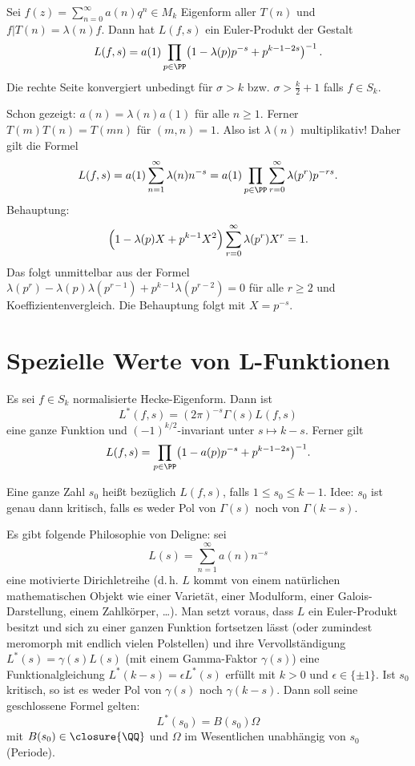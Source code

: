 \begin{satz}
	Sei $f(z) = \sum_{n=0}^\infty a(n)q^n \in M_k$ Eigenform aller $T(n)$ und $f|T(n) = \lambda(n)f$. Dann hat $L(f, s)$ ein Euler-Produkt der Gestalt 
	\[
		L(f,s) = a(1) \prod_{p \in \PP} \bigl(1 - \lambda(p)p^{-s} + p^{k-1-2s}\bigr)^{-1}\,.
	\]
	Die rechte Seite konvergiert unbedingt für $\sigma > k$ bzw. $\sigma > \frac{k}{2} + 1$ falls $f \in S_k$.
\end{satz}


\begin{bewe}
	Schon gezeigt: $a(n) = \lambda(n)a(1)$ für alle $n \geq 1$. Ferner $T(m)T(n) = T(mn)$ für $(m,n) = 1$. Also ist $\lambda(n)$ multiplikativ! Daher gilt die Formel 
	\[L(f,s) = a(1)\sum_{n=1}^\infty \lambda(n)n^{-s} = a(1) \prod_{p \in \PP} \sum_{r=0}^\infty \lambda(p^r)p^{-rs}.\]
	Behauptung: 
	\[
		\Bigl(1 - \lambda(p)X + p^{k-1}X^2\Bigr) \sum_{r=0}^\infty \lambda(p^r) X^r = 1.
	\]
	Das folgt unmittelbar aus der Formel $\lambda(p^r) - \lambda(p)\lambda(p^{r-1}) + p^{k-1}\lambda(p^{r-2}) = 0$ für alle $r \geq 2$ und Koeffizientenvergleich. Die Behauptung folgt mit $X = p^{-s}$.
\end{bewe}


\section{Spezielle Werte von L-Funktionen}

\begin{erin}
	Es sei $f \in S_k$ normalisierte Hecke-Eigenform. Dann ist
	\[
		L^*(f, s) = (2\pi)^{-s} \Gamma(s) L(f, s)
	\]
	eine ganze Funktion und $(-1)^{k/2}$-invariant unter $s \mapsto k - s$. Ferner gilt 
	\[
		L(f,s) = \prod_{p \in \PP} \bigl(1 - a(p)p^{-s} + p^{k-1-2s}\bigr)^{-1}.
	\]
\end{erin}


\begin{defi}
	Eine ganze Zahl $s_0$ heißt  bezüglich $L(f,s)$, falls $1 \leq s_0 \leq k-1$. Idee: $s_0$ ist genau dann kritisch, falls es weder Pol von $\Gamma(s)$ noch von $\Gamma(k-s)$.
\end{defi}

Es gibt folgende Philosophie von Deligne: sei 
\[
	L(s) = \sum_{n=1}^\infty a(n)n^{-s}
\]
eine \glqq{}motivierte\grqq{} Dirichletreihe (d.\,h. $L$ kommt von einem natürlichen mathematischen Objekt wie einer Varietät, einer Modulform, einer Galois-Darstellung, einem Zahlkörper, \ldots). Man setzt voraus, dass $L$ ein Euler-Produkt besitzt und sich zu einer ganzen Funktion fortsetzen lässt (oder zumindest meromorph mit endlich vielen Polstellen) und ihre Vervollständigung $L^*(s) = \gamma(s)L(s)$ (mit einem Gamma-Faktor $\gamma(s)$) eine Funktionalgleichung $L^*(k - s) = \epsilon L^*(s)$ erfüllt mit $k > 0$ und $\epsilon \in \{\pm1\}$. Ist $s_0$ kritisch, so ist es weder Pol von $\gamma(s)$ noch $\gamma(k-s)$. Dann soll seine geschlossene Formel gelten:
\[
	L^*(s_0) = B(s_0) \Omega
\]
mit $B(s_0) \in \closure{\QQ}$ und $\Omega$ \glqq{}im Wesentlichen unabhängig von $s_0$\grqq{} (\glqq Periode\grqq).

